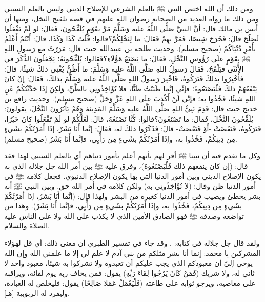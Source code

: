 ومن ذلك أن الله اختص النبي ﷺ بالعلم الشرعي للإصلاح الديني وليس بالعلم السببي ومن ذلك ما رواه العديد من الصحابة رضوان الله عليهم في قصة تلقيح النخل، ومنها أن أنس بن مالك قال: أنَّ النبيَّ صَلَّى اللَّهُ عليه وَسَلَّمَ مَرَّ بقَوْمٍ يُلَقِّحُونَ، فَقالَ: لو لَمْ تَفْعَلُوا لَصَلُحَ قالَ: فَخَرَجَ شِيصًا، فَمَرَّ بهِمْ فَقالَ: ما لِنَخْلِكُمْ؟قالوا: قُلْتَ كَذَا وَكَذَا، قالَ: أَنْتُمْ أَعْلَمُ بأَمْرِ دُنْيَاكُمْ {\footnotesize (صحيح مسلم)}. 
وحديث طلحة بن عبيدالله حيث قال: مَرَرْتُ مع رَسولِ اللهِ ﷺ بقَوْمٍ علَى رُؤُوسِ النَّخْلِ، فَقالَ: ما يَصْنَعُ هَؤُلَاءِ؟فَقالوا: يُلَقِّحُونَهُ؛ يَجْعَلُونَ الذَّكَرَ في الأُنْثَى فيَلْقَحُ، فَقالَ رَسولُ اللهِ صَلَّى اللَّهُ عليه وَسَلَّمَ: ما أَظُنُّ يُغْنِي ذلكَ شيئًا، قالَ: فَأُخْبِرُوا بذلكَ فَتَرَكُوهُ، فَأُخْبِرَ رَسولُ اللهِ صَلَّى اللَّهُ عليه وَسَلَّمَ بذلكَ، فَقالَ: إنْ كانَ يَنْفَعُهُمْ ذلكَ فَلْيَصْنَعُوهُ؛ فإنِّي إنَّما ظَنَنْتُ ظَنًّا، فلا تُؤَاخِذُونِي بالظَّنِّ، وَلَكِنْ إذَا حَدَّثْتُكُمْ عَنِ اللهِ شيئًا، فَخُذُوا به؛ فإنِّي لَنْ أَكْذِبَ علَى اللهِ عَزَّ وَجَلَّ {\footnotesize (صحيح مسلم)}. وحديث رافع بن خديج حيث قال: قَدِمَ نَبِيُّ اللهِ صَلَّى اللَّهُ عليه وَسَلَّمَ المَدِينَةَ وَهُمْ يَأْبُرُونَ النَّخْلَ، يقولونَ: يُلَقِّحُونَ النَّخْلَ، فَقالَ: ما تَصْنَعُونَ؟قالوا: كُنَّا نَصْنَعُهُ، قالَ: لَعَلَّكُمْ لو لَمْ تَفْعَلُوا كانَ خَيْرًا، فَتَرَكُوهُ، فَنَفَضَتْ -أَوْ فَنَقَصَتْ- قالَ: فَذَكَرُوا ذلكَ له، فَقالَ: إنَّما أَنَا بَشَرٌ، إذَا أَمَرْتُكُمْ بشَيءٍ مِن دِينِكُمْ، فَخُذُوا به، وإذَا أَمَرْتُكُمْ بشَيءٍ مِن رَأْيِي، فإنَّما أَنَا بَشَرٌ {\footnotesize (صحيح مسلم)}. 

وكل ما تقدم فيه أن نبينا ﷺ أقر لهم بأنهم أعلم بأمور دنياهم أي بالعلم السببي لهذا فقد قال: (إن كان ينفعهم ذلك فَلْيَصْنَعُوهُ)، وفرق عليه ﷺ بين أمر الله جل جلاله الذي به يكون الإصلاح الديني وبين أمور الدنيا التي بها يكون الإصلاح الدنيوي. فجعل كلامه ﷺ في أمور الدنيا ظن وقال: (لا تُؤَاخِذُونِي به) ولكن كلامه في أمر الله حق. وبين النبي ﷺ أنه بشر يخطئ ويصيب في أمور الدنيا كغيره من البشر ولهذا قال:  (إنَّما أَنَا بَشَرٌ، إذَا أَمَرْتُكُمْ بشَيءٍ مِن دِينِكُمْ، فَخُذُوا به، وإذَا أَمَرْتُكُمْ بشَيءٍ مِن رَأْيِي، فإنَّما أَنَا بَشَرٌ). وهذا من تواضعه وصدقه ﷺ فهو الصادق الأمين الذي لا يكذب على الله ولا على الناس عليه الصلاة والسلام. 

ولقد قال جل جلاله في كتابه: 
\quranayah*[18][110]{\footnotesize \surahname*[18]}. وقد جاء في تفسير الطبري أن معنى ذلك: أي قل لهؤلاء المشركين يا محمد: إنما أنا بشر مثلكم من بني آدم لا علم لي إلا ما علمني الله وإن الله يوحي إليّ أن معبودكم الذي يجب عليكم أن تعبدوه ولا تشركوا به شيئا، معبود واحد لا ثاني له، ولا شريك (فَمَنْ كَانَ يَرْجُوا لِقَاءَ رَبِّهِ) يقول: فمن يخاف ربه يوم لقائه، ويراقبه على معاصيه، ويرجو ثوابه على طاعته (فَلْيَعْمَلْ عَمَلا صَالِحًا) يقول: فليخلص له العبادة، وليفرد له الربوبية [هـ].


